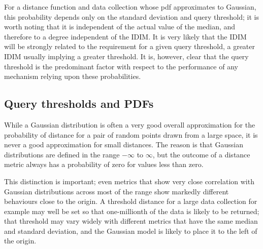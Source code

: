 For a distance function and data collection whose pdf approximates to Gaussian, this probability depends only on the standard deviation and query threshold; it is worth noting that it is independent of the actual value of the median, and therefore to a degree independent of the IDIM.
It is very likely that the IDIM will be strongly related to the requirement for a given query threshold, a greater IDIM usually implying a greater threshold. It is, however, clear that the query threshold is the predominant factor with respect to the performance of any mechanism relying upon these probabilities.

\subsection{Query thresholds and PDFs}
While a Gaussian distribution is often a very good overall approximation for the probability of distance for a pair of random points drawn from a large space, it is never a good approximation for small distances. The reason is that Gaussian distributions are defined in the range $-\infty$ to $\infty$, but the outcome of a distance metric always has a probability of zero for values less than zero.

This distinction is important; even metrics that show very close correlation with Gaussian distributions across most of the range show markedly different behaviours close to the origin. A threshold distance for a large data collection for example may well be set so that one-millionth of the data is likely to be returned; that threshold may vary widely with different metrics that have the same median and standard deviation, and the Gaussian model is likely to place it to the left of the origin.


